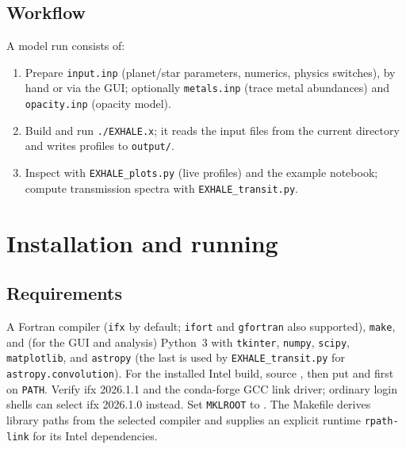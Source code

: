 \documentclass[english,a4paper]{my_memo}
\begin{document}
\subsection{Workflow}
A model run consists of:
\begin{enumerate}\itemsep2pt
\item Prepare \texttt{input.inp} (planet/star parameters, numerics, physics
  switches), by hand or via the GUI; optionally \texttt{metals.inp} (trace
  metal abundances) and \texttt{opacity.inp} (opacity model).
\item Build and run \texttt{./EXHALE.x}; it reads the input files from the current
  directory and writes profiles to \texttt{output/}.
\item Inspect with \texttt{EXHALE\_plots.py} (live profiles) and the example
  notebook; compute transmission spectra with \texttt{EXHALE\_transit.py}.
\end{enumerate}

\section{Installation and running}

\subsection{Requirements}
A Fortran compiler (\texttt{ifx} by default; \texttt{ifort} and \texttt{gfortran}
also supported), \texttt{make}, and (for the GUI and analysis) Python~3 with
\texttt{tkinter}, \texttt{numpy}, \texttt{scipy}, \texttt{matplotlib}, and
\texttt{astropy} (the last is used by \texttt{EXHALE\_transit.py} for
\texttt{astropy.convolution}).
For the installed Intel build, source
, then put
 and
 first on \texttt{PATH}. Verify ifx 2026.1.1
and the conda-forge GCC link driver; ordinary login shells can select ifx
2026.1.0 instead. Set \texttt{MKLROOT} to
.
The Makefile derives library paths from the selected compiler and supplies
an explicit runtime \texttt{rpath-link} for its Intel dependencies.
\end{document}
